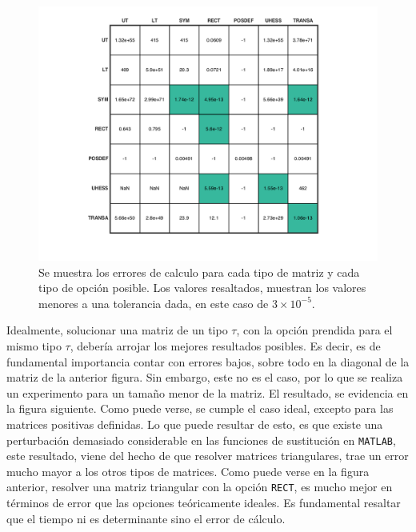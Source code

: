 \documentclass[11pt, spanish]{article}
\begin{document}
\begin{enumerate}
\begin{figure}[h]
\centering
	\includegraphics[scale=0.8]{data/img/plotlinear_error}
	\caption{Se muestra los errores de calculo para cada tipo de matriz y cada tipo de opción posible. Los valores resaltados, muestran los valores menores a una tolerancia dada, en este caso de $3\times 10 ^{-5}$.}
\end{figure}

Idealmente, solucionar una matriz de un tipo $\tau$, con la opción prendida para el mismo tipo $\tau$, debería arrojar los mejores resultados posibles. Es decir, es de fundamental importancia contar con errores bajos, sobre todo en la diagonal de la matriz de la anterior figura. Sin embargo, este no es el caso, por lo que se realiza un experimento para un tamaño menor de la matriz. El resultado, se evidencia en la figura siguiente. Como puede verse, se cumple el caso ideal, excepto para las matrices positivas definidas. Lo que puede resultar de esto, es que existe una perturbación demasiado considerable en las funciones de sustitución en \texttt{MATLAB}, este resultado, viene del hecho de que resolver matrices triangulares, trae un error mucho mayor a los otros tipos de matrices. Como puede verse en la figura anterior, resolver una matriz triangular con la opción \texttt{RECT}, es mucho mejor en términos de error que las opciones teóricamente ideales. Es fundamental resaltar que el tiempo ni es determinante sino el error de cálculo.


\end{enumerate}
\end{document}
